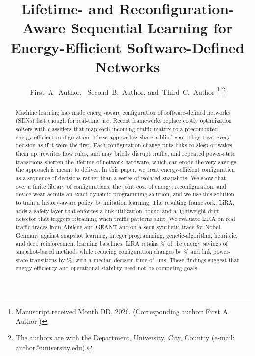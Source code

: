 \documentclass[journal]{IEEEtran}
\begin{document}
\title{Lifetime- and Reconfiguration-Aware Sequential Learning for Energy-Efficient Software-Defined Networks}

\author{First~A.~Author,~ Second~B.~Author, and~Third~C.~Author%
\thanks{Manuscript received Month DD, 2026. (Corresponding author: First A. Author.)}%
\thanks{The authors are with the Department, University, City, Country (e-mail: author@university.edu).}}


\maketitle
\IEEEpeerreviewmaketitle

\begin{abstract}
Machine learning has made energy-aware configuration of software-defined networks (SDNs) fast enough for real-time use. Recent frameworks replace costly optimization solvers with classifiers that map each incoming traffic matrix to a precomputed, energy-efficient configuration. These approaches share a blind spot: they treat every decision as if it were the first. Each configuration change puts links to sleep or wakes them up, rewrites flow rules, and may briefly disrupt traffic, and repeated power-state transitions shorten the lifetime of network hardware, which can erode the very savings the approach is meant to deliver. In this paper, we treat energy-efficient configuration as a sequence of decisions rather than a series of isolated snapshots. We show that, over a finite library of configurations, the joint cost of energy, reconfiguration, and device wear admits an exact dynamic-programming solution, and we use this solution to train a history-aware policy by imitation learning. The resulting framework, LiRA, adds a safety layer that enforces a link-utilization bound and a lightweight drift detector that triggers retraining when traffic patterns shift. We evaluate LiRA on real traffic traces from Abilene and G\'{E}ANT and on a semi-synthetic trace for Nobel-Germany against snapshot learning, integer programming, genetic-algorithm, heuristic, and deep reinforcement learning baselines. LiRA retains \resRetention\% of the energy savings of snapshot-based methods while reducing configuration changes by \resChangeRed\% and link power-state transitions by \resTransRed\%, with a median decision time of \resLatency\ ms. These findings suggest that energy efficiency and operational stability need not be competing goals.
\end{abstract}
\end{document}
